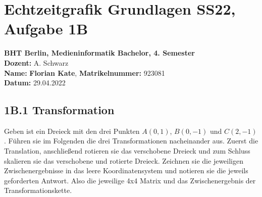 \documentclass[11pt, a4paper]{article} %
\begin{document}
	\section*{Echtzeitgrafik Grundlagen SS22, Aufgabe 1B}
	\textbf{BHT Berlin, Medieninformatik Bachelor, 4. Semester} \\
	\textbf{Dozent:} A. Schwarz \\
	\textbf{Name:} \textbf{\color{gray3}Florian Kate}, \textbf{Matrikelnummer:} 923081 \\
	\textbf{Datum:} 29.04.2022

\subsection*{1B.1 Transformation}
Geben ist ein Dreieck mit den drei Punkten $A(0,1)$, $B(0,-1)$ und $C(2,-1)$. Führen sie im Folgenden die drei Transformationen nacheinander aus. Zuerst die Translation, anschließend rotieren sie das verschobene Dreieck und zum Schluss skalieren sie das verschobene und rotierte Dreieck. Zeichnen sie die jeweiligen Zwischenergebnisse in das leere Koordinatensystem und notieren sie
die jeweils geforderten Antwort. Also die jeweilige 4x4 Matrix und das Zwischenergebnis der Transformationskette.
\begin{figure}[h]
\end{figure}

\newpage
\end{document}
